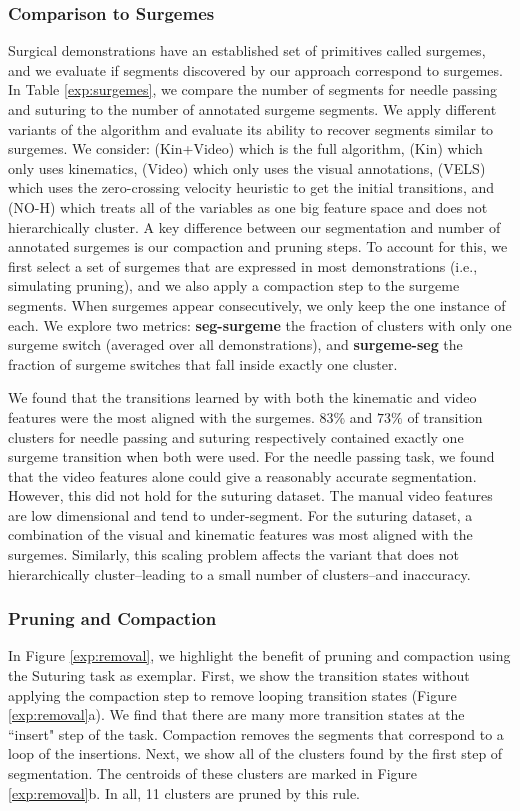 \subsubsection{Comparison to Surgemes}
Surgical demonstrations have an established set of primitives called surgemes, and we evaluate if segments discovered by our approach correspond to surgemes. 
In Table \ref{exp:surgemes}, we compare the number of \tsc segments for needle passing and suturing to the number of annotated surgeme segments.
We apply different variants of the \tsc algorithm and evaluate its ability to recover segments similar to surgemes.
We consider: (Kin+Video) which is the full \tsc algorithm, (Kin) which only uses kinematics, (Video) which only uses the visual annotations, (VELS) which uses the zero-crossing velocity heuristic to get the initial transitions, and (NO-H) which treats all of the variables as one big feature space and does not hierarchically cluster.
A key difference between our segmentation and number of annotated surgemes is our compaction and pruning steps.
To account for this, we first select a set of surgemes that are expressed in most demonstrations (i.e., simulating pruning), and we also apply a compaction step to the surgeme segments.
When surgemes appear consecutively, we only keep the one instance of each.
We explore two metrics: \textbf{seg-surgeme} the fraction of \tsc clusters with only one surgeme switch (averaged over all demonstrations), and \textbf{surgeme-seg} the fraction of surgeme switches that fall inside exactly one \tsc cluster.

 We found that the transitions learned by \tsc with both the kinematic and video features were the most aligned with the surgemes. 
 $83\%$ and $73\%$ of transition clusters for needle passing and suturing respectively contained exactly one surgeme transition when both were used.
 For the needle passing task, we found that the video features alone could give a reasonably accurate segmentation.
 However, this did not hold for the suturing dataset.
 The manual video features are low dimensional and tend to under-segment.
 For the suturing dataset, a combination of the visual and kinematic features was most aligned with the surgemes.
 Similarly, this scaling problem affects the variant that does not hierarchically cluster--leading to a small number of clusters--and inaccuracy.
 
 
 
\subsubsection{Pruning and Compaction} \label{sec:pruningCompaction}
In Figure \ref{exp:removal}, we highlight the benefit of pruning and compaction using the Suturing task as exemplar.
First, we show the transition states without applying the compaction step to remove looping transition states (Figure \ref{exp:removal}a).
We find that there are many more transition states at the ``insert" step of the task.
Compaction removes the segments that correspond to a loop of the insertions.
Next, we show all of the clusters found by the first step of segmentation.
The centroids of these clusters are marked in Figure \ref{exp:removal}b.
In all, 11 clusters are pruned by this rule.

